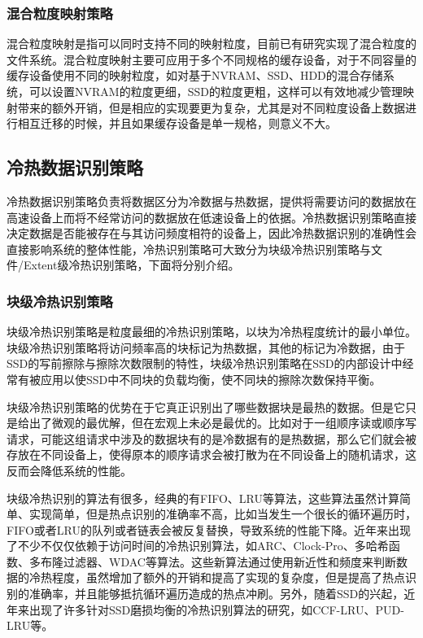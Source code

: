 \subsubsection{混合粒度映射策略}

混合粒度映射是指可以同时支持不同的映射粒度，目前已有研究实现了混合粒度的文件系统\cite{何耀2016面向}。混合粒度映射主要可应用于多个不同规格的缓存设备，对于不同容量的缓存设备使用不同的映射粒度，如对基于NVRAM、SSD、HDD的混合存储系统，可以设置NVRAM的粒度更细，SSD的粒度更粗，这样可以有效地减少管理映射带来的额外开销，但是相应的实现要更为复杂，尤其是对不同粒度设备上数据进行相互迁移的时候，并且如果缓存设备是单一规格，则意义不大。

\subsection{冷热数据识别策略}

冷热数据识别策略负责将数据区分为冷数据与热数据，提供将需要访问的数据放在高速设备上而将不经常访问的数据放在低速设备上的依据。冷热数据识别策略直接决定数据是否能被存在与其访问频度相符的设备上，因此冷热数据识别的准确性会直接影响系统的整体性能，冷热识别策略可大致分为块级冷热识别策略与文件/Extent级冷热识别策略，下面将分别介绍。

\subsubsection{块级冷热识别策略}

块级冷热识别策略是粒度最细的冷热识别策略，以块为冷热程度统计的最小单位。块级冷热识别策略将访问频率高的块标记为热数据，其他的标记为冷数据，由于SSD的写前擦除与擦除次数限制的特性，块级冷热识别策略在SSD的内部设计中经常有被应用以使SSD中不同块的负载均衡，使不同块的擦除次数保持平衡。

块级冷热识别策略的优势在于它真正识别出了哪些数据块是最热的数据。但是它只是给出了微观的最优解，但在宏观上未必是最优的。比如对于一组顺序读或顺序写请求，可能这组请求中涉及的数据块有的是冷数据有的是热数据，那么它们就会被存放在不同设备上，使得原本的顺序请求会被打散为在不同设备上的随机请求，这反而会降低系统的性能。

块级冷热识别的算法有很多，经典的有FIFO、LRU等算法，这些算法虽然计算简单、实现简单，但是热点识别的准确率不高，比如当发生一个很长的循环遍历时，FIFO或者LRU的队列或者链表会被反复替换，导致系统的性能下降。近年来出现了不少不仅仅依赖于访问时间的冷热识别算法，如ARC\cite{megiddo2003arc}、Clock-Pro\cite{jiang2005clock}、多哈希函数\cite{hsieh2006efficient}、多布隆过滤器\cite{park2011hot}、WDAC\cite{park2011hot}等算法。这些新算法通过使用新近性和频度来判断数据的冷热程度，虽然增加了额外的开销和提高了实现的复杂度，但是提高了热点识别的准确率，并且能够抵抗循环遍历造成的热点冲刷。另外，随着SSD的兴起，近年来出现了许多针对SSD磨损均衡的冷热识别算法的研究，如CCF-LRU\cite{li2009ccf}、PUD-LRU\cite{hu2010pud}等。

